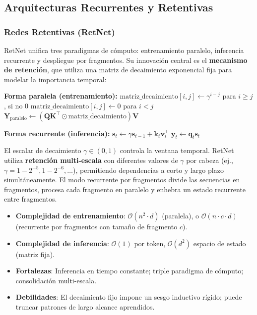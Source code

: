 \documentclass[11pt,a4paper]{article}
\begin{document}
\subsection{Arquitecturas Recurrentes y Retentivas}

\subsubsection{Redes Retentivas (RetNet)}
RetNet \citep{sun_retentive_2023} unifica tres paradigmas de cómputo: entrenamiento paralelo, inferencia recurrente y despliegue por fragmentos. Su innovación central es el \textbf{mecanismo de retención}, que utiliza una matriz de decaimiento exponencial fija para modelar la importancia temporal:

\begin{algorithmic}[1]
\State \textbf{Forma paralela (entrenamiento):}
\State $\text{matriz\_decaimiento}[i,j] \gets \gamma^{i-j}$ para $i \geq j$, si no $0$ 
\State $\text{matriz\_decaimiento}[i,j] \gets 0$ para $i < j$ 
\State $\mathbf{Y}_{\text{paralelo}} \gets (\mathbf{Q}\mathbf{K}^\top \odot \text{matriz\_decaimiento}) \mathbf{V}$ 
\end{algorithmic}

\begin{algorithmic}[1]
\State \textbf{Forma recurrente (inferencia):}
    \State $\mathbf{s}_t \gets \gamma \mathbf{s}_{t-1} + \mathbf{k}_t \mathbf{v}_t^\top$ 
    \State $\mathbf{y}_t \gets \mathbf{q}_t \mathbf{s}_t$ 
\EndFor
\end{algorithmic}

El escalar de decaimiento $\gamma \in (0,1)$ controla la ventana temporal. RetNet utiliza \textbf{retención multi-escala} con diferentes valores de $\gamma$ por cabeza (ej., $\gamma = 1 - 2^{-5}, 1 - 2^{-6}, \ldots$), permitiendo dependencias a corto y largo plazo simultáneamente. El modo recurrente por fragmentos divide las secuencias en fragmentos, procesa cada fragmento en paralelo y enhebra un estado recurrente entre fragmentos.

\begin{itemize}[leftmargin=*]
    \item \textbf{Complejidad de entrenamiento}: $\mathcal{O}(n^2 \cdot d)$ (paralela), o $\mathcal{O}(n \cdot c \cdot d)$ (recurrente por fragmentos con tamaño de fragmento $c$).
    \item \textbf{Complejidad de inferencia}: $\mathcal{O}(1)$ por token, $\mathcal{O}(d^2)$ espacio de estado (matriz fija).
    \item \textbf{Fortalezas}: Inferencia en tiempo constante; triple paradigma de cómputo; consolidación multi-escala.
    \item \textbf{Debilidades}: El decaimiento fijo impone un sesgo inductivo rígido; puede truncar patrones de largo alcance aprendidos.
\end{itemize}
\end{document}
